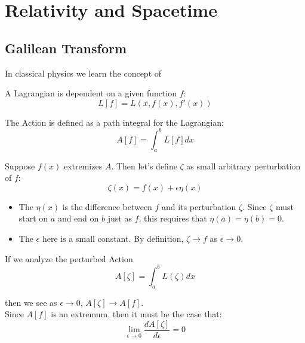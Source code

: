 \documentclass{article}
\newcommand{\DD}[2]{\frac{d #1}{d #2}}
\begin{document}

\section{Relativity and Spacetime}
\subsection{Galilean Transform}
In classical physics we learn the concept of

A Lagrangian is dependent on a given function $f$:
\begin{equation}
    L[f] = L \left( x, f(x), f'(x) \right)
\end{equation}

The Action is defined as a path integral for the Lagrangian:
\begin{equation}
    A[f] = \int_a^b L[f] dx
\end{equation}

Suppose $f(x)$ extremizes $A$. Then let's define $\zeta$ as small arbitrary perturbation of $f$:
\begin{equation}
    \label{eqn:perturbation}
    \zeta(x) = f(x) + \epsilon \eta(x)
\end{equation}
\begin{itemize}
    \setlength{\itemindent}{2em}
    \item The $\eta(x)$ is the difference between $f$ and its perturbation $\zeta$. Since $\zeta$ must start on $a$ and end on $b$ just as $f$, this requires that $\eta(a) = \eta(b) = 0$.
    \item The $\epsilon$ here is a small constant. By definition, $\zeta \to f$ as $\epsilon \to 0$.
\end{itemize}

If we analyze the perturbed Action
\begin{equation}
    A[\zeta] = \int_a^b L \left( \zeta \right) dx
\end{equation}

\hspace{\parindent} then we see as $\epsilon \to 0$, $A[\zeta] \to A[f]$.
\\

Since $A[f]$ is an extremum, then it must be the case that:
\begin{equation}
    \label{eqn:actionlimit}
    \lim_{\epsilon \to 0} \DD{A[\zeta]}{\epsilon} = 0
\end{equation}
\end{document}
